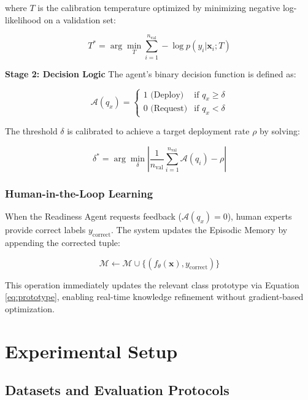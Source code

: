 \documentclass[conference]{IEEEtran}
\begin{document}
where $T$ is the calibration temperature optimized by minimizing negative log-likelihood on a validation set:

\begin{equation}
T^* = \arg\min_T \sum_{i=1}^{n_{\text{val}}} -\log p(y_i|\mathbf{x}_i; T) \label{eq:temperature_opt}
\end{equation}

\textbf{Stage 2: Decision Logic}
The agent's binary decision function is defined as:

\begin{equation}
\mathcal{A}(q_x) = \begin{cases} 
1 \text{ (Deploy)} & \text{if } q_x \geq \delta \\
0 \text{ (Request)} & \text{if } q_x < \delta
\end{cases} \label{eq:decision}
\end{equation}

The threshold $\delta$ is calibrated to achieve a target deployment rate $\rho$ by solving:

\begin{equation}
\delta^* = \arg\min_\delta \left|\frac{1}{n_{\text{val}}} \sum_{i=1}^{n_{\text{val}}} \mathcal{A}(q_i) - \rho\right| \label{eq:threshold_opt}
\end{equation}

\subsubsection{Human-in-the-Loop Learning}

When the Readiness Agent requests feedback ($\mathcal{A}(q_x) = 0$), human experts provide correct labels $y_{\text{correct}}$. The system updates the Episodic Memory by appending the corrected tuple:

\begin{equation}
\mathcal{M} \leftarrow \mathcal{M} \cup \{(f_\theta(\mathbf{x}), y_{\text{correct}})\} \label{eq:memory_update}
\end{equation}

This operation immediately updates the relevant class prototype via Equation \eqref{eq:prototype}, enabling real-time knowledge refinement without gradient-based optimization.

\section{Experimental Setup}

\subsection{Datasets and Evaluation Protocols}
\end{document}

